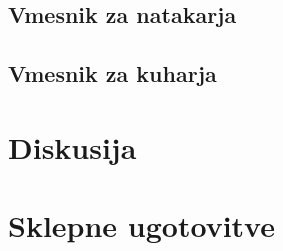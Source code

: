 \documentclass[a4paper, 12pt]{book}
\begin{document}
\section{Vmesnik za natakarja}
\section{Vmesnik za kuharja}

\chapter {Diskusija}

\chapter {Sklepne ugotovitve}
\newpage %
\ \\
\clearpage
{}


\end{document}
